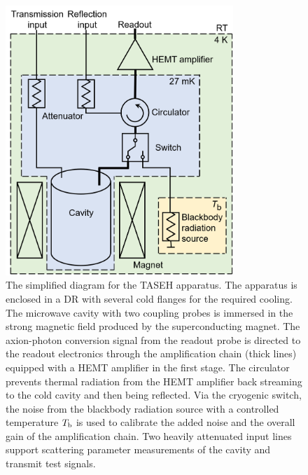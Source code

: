 \documentclass[%
 reprint,prl, %
superscriptaddress,
nobibnotes,
 amsmath,amssymb,
 aps,
]{revtex4-2}
\begin{document}
\begin{figure} 
  \centering
  \includegraphics[width=8.6cm]{figures/colored_Simplified_wiring_V3.png}
  \caption{%
The simplified diagram for the TASEH apparatus. 
The apparatus is enclosed in a DR with several cold flanges for 
the required cooling. 
The microwave cavity with two coupling probes is immersed in the strong 
magnetic field produced by the superconducting magnet.
The axion-photon conversion signal from the readout probe is directed 
to the readout electronics through the amplification chain (thick lines) 
equipped with a HEMT amplifier in the first stage. 
The circulator prevents thermal radiation from the HEMT amplifier back 
streaming to the cold cavity and then being reflected. Via the
cryogenic switch, the noise from the blackbody radiation source with a 
controlled temperature $T_{\text b}$ is used to calibrate the added noise and 
the overall gain of the amplification chain. Two heavily attenuated input 
lines support scattering parameter measurements of the cavity and transmit 
test signals. 
  }
  \label{fig:TASEH}
\end{figure}
\end{document}
